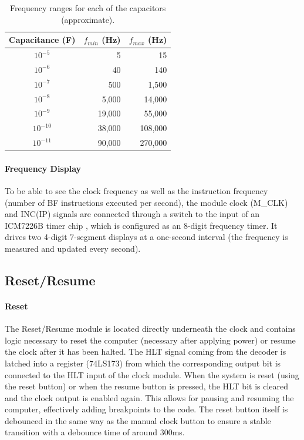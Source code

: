 \begin{table}
  \centering
  \begin{tabular}{c|r|r}
    Capacitance (F) & $f_{min}$ (Hz) & $f_{max}$ (Hz) \\ \hline
    $10^{-5}$  & 5 & 15 \\
    $10^{-6}$  & 40 & 140 \\
    $10^{-7}$  & 500 & 1,500 \\
    $10^{-8}$  & 5,000 & 14,000 \\
    $10^{-9}$  & 19,000 & 55,000 \\
    $10^{-10}$ & 38,000 & 108,000 \\
    $10^{-11}$ & 90,000 & 270,000 \\
  \end{tabular}
  \caption{Frequency ranges for each of the capacitors (approximate).}
  \label{tab:frequencycontrol}
\end{table}

\paragraph{Frequency Display} To be able to see the clock frequency as well as the instruction frequency (number of BF instructions executed per second), the module clock (M\_CLK) and INC(IP) signals are connected through a switch to the input of an ICM7226B timer chip \cite{7226B}, which is configured as an 8-digit frequency timer. It drives two 4-digit 7-segment displays at a one-second interval (the frequency is measured and updated every second).

\subsection{Reset/Resume} \label{sec:resetresume}
\paragraph{Reset} The Reset/Resume module is located directly underneath the clock and contains logic necessary to reset the computer (necessary after applying power) or resume the clock after it has been halted. The HLT signal coming from the decoder is latched into a register (74LS173) from which the corresponding output bit is connected to the HLT input of the clock module. When the system is reset (using the reset button) or when the resume button is pressed, the HLT bit is cleared and the clock output is enabled again. This allows for pausing and resuming the computer, effectively adding breakpoints to the code. The reset button itself is debounced in the same way as the manual clock button to ensure a stable transition with a debounce time of around 300ms.

